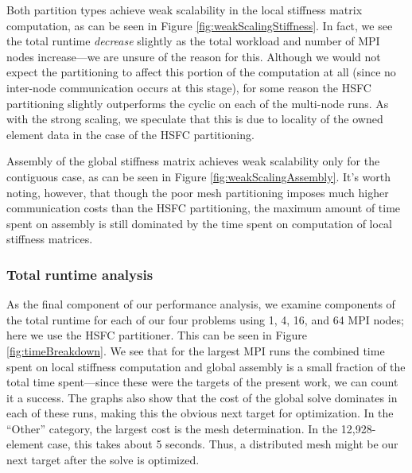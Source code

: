 Both partition types achieve weak scalability in the local stiffness matrix computation, as can be seen in Figure \ref{fig:weakScalingStiffness}.  In fact, we see the total runtime \emph{decrease} slightly as the total workload and number of MPI nodes increase---we are unsure of the reason for this. Although we would not expect the partitioning to affect this portion of the computation at all (since no inter-node communication occurs at this stage), for some reason the HSFC partitioning slightly outperforms the cyclic on each of the multi-node runs.  As with the strong scaling, we speculate that this is due to locality of the owned element data in the case of the HSFC partitioning.

Assembly of the global stiffness matrix achieves weak scalability only for the contiguous case, as can be seen in Figure \ref{fig:weakScalingAssembly}. It's worth noting, however, that though the poor mesh partitioning imposes much higher communication costs than the HSFC partitioning, the maximum amount of time spent on assembly is still dominated by the time spent on computation of local stiffness matrices.

\subsubsection{Total runtime analysis}\label{sec:runtimeAnalysis}
As the final component of our performance analysis, we examine components of the total runtime for each of our four problems using 1, 4, 16, and 64 MPI nodes; here we use the HSFC partitioner.  This can be seen in Figure \ref{fig:timeBreakdown}.  We see that for the largest MPI runs the combined time spent on local stiffness computation and global assembly is a small fraction of the total time spent---since these were the targets of the present work, we can count it a success.  The graphs also show that the cost of the global solve dominates in each of these runs, making this the obvious next target for optimization.  In the ``Other'' category, the largest cost is the mesh determination.  In the 12,928-element case, this takes about 5 seconds.  Thus, a distributed mesh might be our next target after the solve is optimized.

